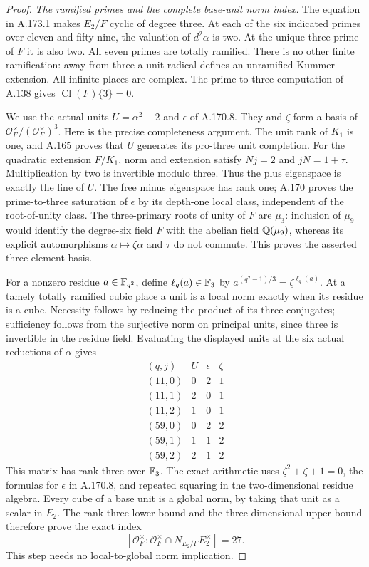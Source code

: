 \begin{proof}
\emph{The ramified primes and the complete base-unit norm index.}
The equation in A.173.1 makes \(E_2/F\) cyclic of degree three.
At each of the six indicated primes over eleven and fifty-nine,
the valuation of \(d^2\alpha\) is two.  At the unique three-prime
of \(F\) it is also two.  All seven primes are totally ramified.
There is no other finite ramification: away from three a unit
radical defines an unramified Kummer extension.  All infinite
places are complex.  The prime-to-three computation of A.138
gives \(\operatorname{Cl}(F)\{3\}=0\).

We use the actual units \(U=\alpha^2-2\) and \(\epsilon\) of
A.170.8.  They and \(\zeta\) form a basis of
\(\mathcal O_F^\times/(\mathcal O_F^\times)^3\).
Here is the precise completeness argument.  The unit rank of
\(K_1\) is one, and A.165 proves that \(U\) generates its
pro-three unit completion.  For the quadratic extension
\(F/K_1\), norm and extension satisfy \(Nj=2\) and
\(jN=1+\tau\).  Multiplication by two is invertible modulo
three.  Thus the plus eigenspace is exactly the line of \(U\).
The free minus eigenspace has rank one; A.170 proves the
prime-to-three saturation of \(\epsilon\) by its depth-one
local class, independent of the root-of-unity class.  The
three-primary roots of unity of \(F\) are \(\mu_3\): inclusion
of \(\mu_9\) would identify the degree-six field \(F\) with
the abelian field \(\mathbb Q(\mu_9)\), whereas its explicit
automorphisms \(\alpha\mapsto\zeta\alpha\) and \(\tau\)
do not commute.  This proves the asserted three-element basis.

For a nonzero residue \(a\in\mathbb F_{q^2}\), define
\(\ell_q(a)\in\mathbb F_3\) by
\(a^{(q^2-1)/3}=\zeta^{\ell_q(a)}\).
At a tamely totally ramified cubic place a unit is a local norm
exactly when its residue is a cube.  Necessity follows by
reducing the product of its three conjugates; sufficiency follows
from the surjective norm on principal units, since three is
invertible in the residue field.  Evaluating the displayed units
at the six actual reductions of \(\alpha\) gives
\[
\begin{array}{c|rrr}
 (q,j)&U&\epsilon&\zeta\\ \hline
 (11,0)&0&2&1\\
 (11,1)&2&0&1\\
 (11,2)&1&0&1\\
 (59,0)&0&2&2\\
 (59,1)&1&1&2\\
 (59,2)&2&1&2
\end{array}
\tag{A.173.5}
\]
This matrix has rank three over \(\mathbb F_3\).
The exact arithmetic uses \(\zeta^2+\zeta+1=0\), the formulas
for \(\epsilon\) in A.170.8, and repeated squaring in the
two-dimensional residue algebra.  Every cube of a base unit
is a global norm, by taking that unit as a scalar in \(E_2\).
The rank-three lower bound and the three-dimensional upper
bound therefore prove the exact index
\[
 [\mathcal O_F^\times:
       \mathcal O_F^\times\cap N_{E_2/F}E_2^\times]=27.
\tag{A.173.6}
\]
This step needs no local-to-global norm implication.


\end{proof}
